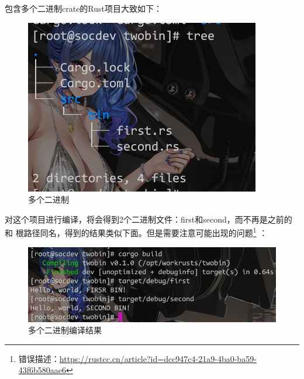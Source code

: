 包含多个二进制crate的Rust项目大致如下：
\begin{figure}[H]
  \centering
  \includegraphics[width=\linewidth]{rust_more_bin.png}
  \caption{多个二进制}
  \label{fig:rust_more_bin}
\end{figure}
对这个项目进行编译，将会得到2个二进制文件：first和second，而不再是之前的和
根路径同名，得到的结果类似下面。但是需要注意可能出现的问题\footnote{错误描述：\url{https://rustcc.cn/article?id=dcc947c4-21a9-4ba0-ba59-43f6b580aae6}} ：
\begin{figure}[H]
  \centering
  \includegraphics[width=\linewidth]{rust_more_bin_res.png}
  \caption{多个二进制编译结果}
  \label{fig:rust_more_bin_res}
\end{figure}
